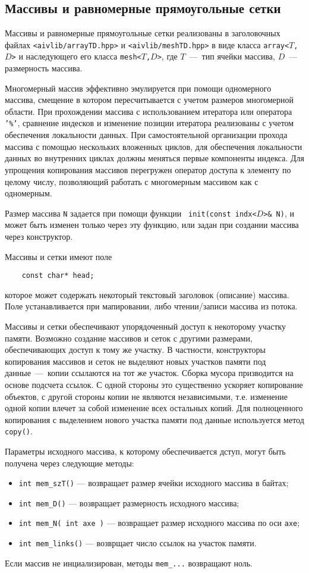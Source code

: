 \subsection{Массивы и равномерные прямоугольные сетки}
Массивы и равномерные прямоугольные сетки реализованы в заголовочных файлах
{\tt <aivlib/arrayTD.hpp>} и {\tt <aivlib/meshTD.hpp>} в виде класса {\tt array<$T$,$D$>} и наследующего
его класса {\tt mesh<$T$,$D$>}, где $T$~---~тип ячейки массива, $D$~---
размерность массива. 

Многомерный массив эффективно эмулируется при помощи
одномерного массива, смещение в котором пересчитывается с учетом размеров
многомерной области. При прохождении массива с использованием итератора или
оператора {\tt '\%'},
сравнение индесков и изменение позиции итератора реализованы с учетом
обеспечения локальности данных. При самостоятельной организации прохода
массива с помощью нескольких вложенных циклов, для обеспечения локальности
данных во внутренних циклах должны меняться первые компоненты индекса. Для
упрощения копирования массивов перегружен оператор доступа к элементу по
целому числу, позволяющий работать с многомерным массивом как с одномерным.

Размер массива {\tt N} задается при помощи функции {\tt
  init(const indx<$D$>\& N)}, и может быть изменен только через эту функцию,
или задан при создании массива через конструктор. 

Массивы и сетки имеют поле 
\begin{verbatim}
    const char* head;
\end{verbatim}
которое может содержать некоторый текстовый заголовок (описание) массива. Поле
устанавливается при мапировании, либо чтении/записи массива из потока. 

Массивы и сетки обеспечивают упорядоченный доступ к некоторому участку памяти.
Возможно создание массивов и сеток с другими размерами, обеспечивающих доступ
к тому же участку. В частности, конструкторы копирования массивов и сеток не
выделяют новых участков памяти под данные~---~копии ссылаются на тот же
участок. Сборка мусора призводится на основе подсчета ссылок.  С одной
стороны это существенно ускоряет копирование объектов, с другой стороны копии не являются
независимыми, т.е. изменение одной копии влечет за собой изменение всех
остальных копий. Для полноценного копирования с выделением нового участка
памяти под данные используется метод {\tt copy()}.

Параметры исходного массива, к которому обеспечивается дступ, могут быть
получена через следующие методы:
\begin{itemize}
\item \verb'int mem_szT()' --- возвращает размер ячейки исходного массива в байтах;
\item \verb'int mem_D()' --- возвращает размерность исходного массива;
\item \verb'int mem_N( int axe )' --- возвращает размер исходного массива по оси {\tt axe};
\item \verb'int mem_links()' --- возврщает число ссылок на участок памяти.
\end{itemize}
Если массив не инциализирован, методы {\tt mem\_...} возвращают ноль.

